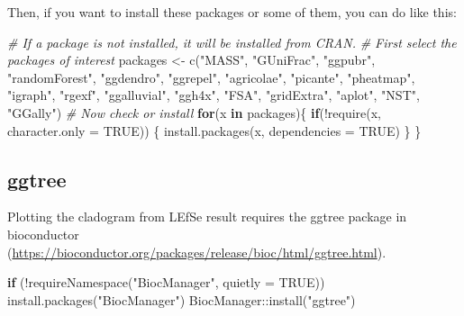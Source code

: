 \documentclass[
]{book}
\newenvironment{Shaded}{\begin{snugshade}}{\end{snugshade}}
\newcommand{\AttributeTok}[1]{\textcolor[rgb]{0.77,0.63,0.00}{#1}}
\newcommand{\CommentTok}[1]{\textcolor[rgb]{0.56,0.35,0.01}{\textit{#1}}}
\newcommand{\ConstantTok}[1]{\textcolor[rgb]{0.00,0.00,0.00}{#1}}
\newcommand{\ControlFlowTok}[1]{\textcolor[rgb]{0.13,0.29,0.53}{\textbf{#1}}}
\newcommand{\FunctionTok}[1]{\textcolor[rgb]{0.00,0.00,0.00}{#1}}
\newcommand{\NormalTok}[1]{#1}
\newcommand{\OtherTok}[1]{\textcolor[rgb]{0.56,0.35,0.01}{#1}}
\newcommand{\SpecialCharTok}[1]{\textcolor[rgb]{0.00,0.00,0.00}{#1}}
\newcommand{\StringTok}[1]{\textcolor[rgb]{0.31,0.60,0.02}{#1}}
\begin{document}
Then, if you want to install these packages or some of them, you can do like this:

\begin{Shaded}
\begin{Highlighting}[]
\CommentTok{\# If a package is not installed, it will be installed from CRAN.}
\CommentTok{\# First select the packages of interest}
\NormalTok{packages }\OtherTok{\textless{}{-}} \FunctionTok{c}\NormalTok{(}\StringTok{"MASS"}\NormalTok{, }\StringTok{"GUniFrac"}\NormalTok{, }\StringTok{"ggpubr"}\NormalTok{, }\StringTok{"randomForest"}\NormalTok{, }\StringTok{"ggdendro"}\NormalTok{, }\StringTok{"ggrepel"}\NormalTok{, }\StringTok{"agricolae"}\NormalTok{, }\StringTok{"picante"}\NormalTok{, }\StringTok{"pheatmap"}\NormalTok{, }\StringTok{"igraph"}\NormalTok{, }\StringTok{"rgexf"}\NormalTok{, }
    \StringTok{"ggalluvial"}\NormalTok{, }\StringTok{"ggh4x"}\NormalTok{, }\StringTok{"FSA"}\NormalTok{, }\StringTok{"gridExtra"}\NormalTok{, }\StringTok{"aplot"}\NormalTok{, }\StringTok{"NST"}\NormalTok{, }\StringTok{"GGally"}\NormalTok{)}
\CommentTok{\# Now check or install}
\ControlFlowTok{for}\NormalTok{(x }\ControlFlowTok{in}\NormalTok{ packages)\{}
    \ControlFlowTok{if}\NormalTok{(}\SpecialCharTok{!}\FunctionTok{require}\NormalTok{(x, }\AttributeTok{character.only =} \ConstantTok{TRUE}\NormalTok{)) \{}
        \FunctionTok{install.packages}\NormalTok{(x, }\AttributeTok{dependencies =} \ConstantTok{TRUE}\NormalTok{)}
\NormalTok{    \}}
\NormalTok{\}}
\end{Highlighting}
\end{Shaded}

\hypertarget{ggtree}{%
\subsection{ggtree}\label{ggtree}}

Plotting the cladogram from LEfSe result requires the ggtree package in bioconductor (\url{https://bioconductor.org/packages/release/bioc/html/ggtree.html}).

\begin{Shaded}
\begin{Highlighting}[]
\ControlFlowTok{if}\NormalTok{ (}\SpecialCharTok{!}\FunctionTok{requireNamespace}\NormalTok{(}\StringTok{"BiocManager"}\NormalTok{, }\AttributeTok{quietly =} \ConstantTok{TRUE}\NormalTok{)) }\FunctionTok{install.packages}\NormalTok{(}\StringTok{"BiocManager"}\NormalTok{)}
\NormalTok{BiocManager}\SpecialCharTok{::}\FunctionTok{install}\NormalTok{(}\StringTok{"ggtree"}\NormalTok{)}
\end{Highlighting}
\end{Shaded}
\end{document}
